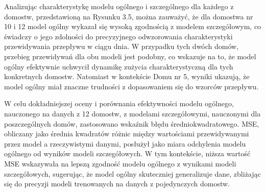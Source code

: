 \documentclass[a4paper,twoside,12pt]{book}
\begin{document}
Analizując charakterystykę modelu ogólnego i szczególnego dla każdego z domostw, przedstawioną na Rysunku 3.5, można zauważyć, że dla domostwa nr 10 i 12 model ogólny wykazał się wysoką zgodnością z modelem szczegółowym, co świadczy o jego zdolności do precyzyjnego odwzorowania charakterystyki przewidywania przepływu w ciągu dnia. W przypadku tych dwóch domów, przebieg przewidywań dla obu modeli jest podobny, co wskazuje na to, że model ogólny efektywnie uchwycił dynamikę zużycia charakterystyczną dla tych konkretnych domostw. Natomiast w kontekście Domu nr 5, wyniki ukazują, że model ogólny miał znaczne trudności z dopasowaniem się do wzorców przepływu.

W celu dokładniejszej oceny i porównania efektywności modelu ogólnego, nauczonego na danych z 12 domostw, z modelami szczegółowymi, nauczonymi dla poszczególnych domów, zastosowano wskaźnik błędu średniokwadratowego. MSE, obliczany jako średnia kwadratów różnic między wartościami przewidywanymi przez model a rzeczywistymi danymi, posłużył jako miara odchylenia modelu ogólnego od wyników modeli szczegółowych. W tym kontekście, niższa wartość MSE wskazywała na lepszą zgodność modelu ogólnego z wynikami modeli szczegółowych, sugerując, że model ogólny skuteczniej generalizuje dane, zbliżając się do precyzji modeli trenowanych na danych z pojedynczych domostw.
\end{document}
